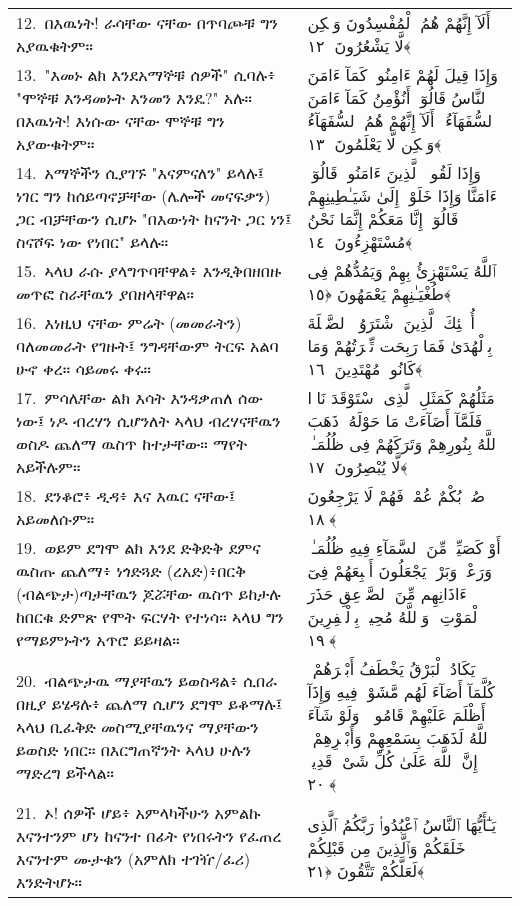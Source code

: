 \documentclass[11pt,a4paper,oneside]{article}%
\newcommand{\mytextarabic}[1]{\textarabic{ #1 \flushright}}
\begin{document}
\begin{longtable}{%
  @{}
    p{}
  @{~~~}
    p{}
    @{}
}
12.\ በእዉነት! ራሳቸው ናቸው በጥባጮቹ ግን አያዉቁትም። &  \mytextarabic{أَلَآ إِنَّهُمْ هُمُ ٱلْمُفْسِدُونَ وَلَٟكِن لَّا يَشْعُرُونَ ﴿١٢﴾} \\
13.\ "እመኑ ልክ እንደአማኞቹ ሰዎች" ሲባሉ፥ "ሞኞቹ እንዳመኑት እንመን እንዴ?" አሉ። በእዉነት! እነሱው ናቸው ሞኞቹ ግን አያውቁትም። &  \mytextarabic{وَإِذَا قِيلَ لَهُمْ ءَامِنُوا۟ كَمَآ ءَامَنَ ٱلنَّاسُ قَالُوٓا۟ أَنُؤْمِنُ كَمَآ ءَامَنَ ٱلسُّفَهَآءُ ۗ أَلَآ إِنَّهُمْ هُمُ ٱلسُّفَهَآءُ وَلَٟكِن لَّا يَعْلَمُونَ ﴿١٣﴾}   \\
14.\ አማኞችን ሲያገኙ "እናምናለን" ይላሉ፤ ነገር ግን ከሰይጣኖቻቸው (ሌሎች መናፍቃን) ጋር ብቻቸውን ሲሆኑ "በእውነት ከናንት ጋር ነን፤ ስናሾፍ ነው የነበር" ይላሉ። &  \mytextarabic{وَإِذَا لَقُوا۟ ٱلَّذِينَ ءَامَنُوا۟ قَالُوٓا۟ ءَامَنَّا وَإِذَا خَلَوْا۟ إِلَىٰ شَيَـٰطِينِهِمْ قَالُوٓا۟ إِنَّا مَعَكُمْ إِنَّمَا نَحْنُ مُسْتَهْزِءُونَ ﴿١٤﴾} \\
15.\ ኣላህ ራሱ ያላግጥባቸዋል፥ እንዲቅበዘበዙ መጥፎ ስራቸዉን ያበዘላቸዋል። &  \mytextarabic{ٱللَّهُ يَسْتَهْزِئُ بِهِمْ وَيَمُدُّهُمْ فِى طُغْيَـٰنِهِمْ يَعْمَهُونَ ﴿١٥﴾}\\ 
16.\ እነዚህ ናቸው ምሬት (መመራትን) ባለመመራት የገዙት፤ ንግዳቸውም ትርፍ አልባ ሁኖ ቀረ። ሳይመሩ ቀሩ። &  \mytextarabic{أُو۟لَٟٓئِكَ ٱلَّذِينَ ٱشْتَرَوُا۟ ٱلضَّلَٟلَةَ بِٱلْهُدَىٰ فَمَا رَبِحَت تِّجَٟرَتُهُمْ وَمَا كَانُوا۟ مُهْتَدِينَ ﴿١٦﴾} \\
17.\ ምሳሌቸው ልክ እሳት እንዳቃጠለ ሰው ነው፤ ነዶ ብረሃን ሲሆንለት ኣላህ ብረሃናቸዉን ወስዶ ጨለማ ዉስጥ ከተታቸው። ማየት  አይችሉም።
&  \mytextarabic{ مَثَلُهُمْ كَمَثَلِ ٱلَّذِى ٱسْتَوْقَدَ نَارًۭا فَلَمَّآ أَضَآءَتْ مَا حَوْلَهُۥ ذَهَبَ ٱللَّهُ بِنُورِهِمْ وَتَرَكَهُمْ فِى ظُلُمَـٰتٍۢ لَّا يُبْصِرُونَ ﴿١٧﴾}\\ 
18.\ ደንቆሮ፥ ዲዳ፥ እና እዉር ናቸው፤  አይመለሱም።  &  \mytextarabic{ صُمٌّۢ بُكْمٌ عُمْىٌۭ فَهُمْ لَا يَرْجِعُونَ ﴿١٨﴾}\\
19.\ ወይም ደግሞ ልክ እንደ ድቅድቅ ደምና  ዉስጡ ጨለማ፥ ነጎድጓድ (ረአድ)፥በርቅ  (ብልጭታ)ጣታቸዉን ጆሯቸው ዉስጥ  ይከታሉ ከበርቁ ድምጽ የሞት ፍርሃት የተነሳ።  ኣላህ ግን የማይምኑትን አጥሮ ይይዛል። &  \mytextarabic{ أَوْ كَصَيِّبٍۢ مِّنَ ٱلسَّمَآءِ فِيهِ ظُلُمَـٰتٌۭ وَرَعْدٌۭ وَبَرْقٌۭ يَجْعَلُونَ أَصَٟبِعَهُمْ فِىٓ ءَاذَانِهِم مِّنَ ٱلصَّوَٟعِقِ حَذَرَ ٱلْمَوْتِ ۚ وَٱللَّهُ مُحِيطٌۢ بِٱلْكَٟفِرِينَ ﴿١٩﴾}\\
20.\ ብልጭታዉ ማያቸዉን ይወስዳል፥ ሲበራ በዚያ ይሄዳሉ፥ ጨለማ ሲሆን ደግሞ ይቆማሉ፤ ኣላህ ቢፈቅድ መስሚያቸዉንና ማያቸውን ይወስድ ነበር። በእርግጠኛንት ኣላህ ሁሉን ማድረግ ይችላል። &  \mytextarabic{يَكَادُ ٱلْبَرْقُ يَخْطَفُ أَبْصَٟرَهُمْ ۖ كُلَّمَآ أَضَآءَ لَهُم مَّشَوْا۟ فِيهِ وَإِذَآ أَظْلَمَ عَلَيْهِمْ قَامُوا۟ ۚ وَلَوْ شَآءَ ٱللَّهُ لَذَهَبَ بِسَمْعِهِمْ وَأَبْصَٟرِهِمْ ۚ إِنَّ ٱللَّهَ عَلَىٰ كُلِّ شَىْءٍۢ قَدِيرٌۭ ﴿٢٠﴾}\\
21.\ ኦ! ሰዎች ሆይ፥ አምላካችሁን አምልኩ እናንተንም ሆነ ከናንተ በፊት የነበሩትን የፈጠረ እናንተም ሙታቁን (አምለክ ተገዥ/ፈሪ) እንድትሆኑ። &  \mytextarabic{يَـٰٓأَيُّهَا ٱلنَّاسُ ٱعْبُدُوا۟ رَبَّكُمُ ٱلَّذِى خَلَقَكُمْ وَٱلَّذِينَ مِن قَبْلِكُمْ لَعَلَّكُمْ تَتَّقُونَ ﴿٢١﴾}\\

\end{longtable}
\end{document}
